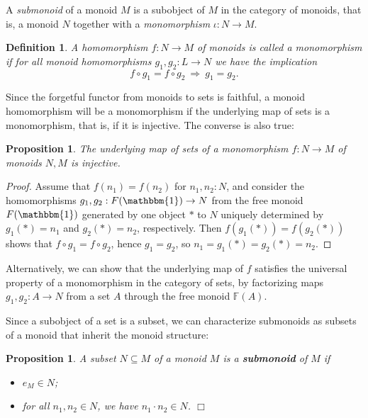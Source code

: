 \documentclass{amsart}
\theoremstyle{plain}
\numberwithin{equation}{section} %
\numberwithin{figure}{section} %
\theoremstyle{plain}
\theoremstyle{plain}
\theoremstyle{plain}
\theoremstyle{plain}
\theoremstyle{plain}
\newtheorem{prop}[thm]{Proposition} %
\theoremstyle{plain}
\newtheorem{Def}[thm]{Definition} %
\theoremstyle{remark}
\theoremstyle{remark}
\theoremstyle{remark}
\begin{document}
A \textit{submonoid} of a monoid $M$ is a subobject of $M$ in the category of monoids, that is, a monoid $N$ together with a \textit{monomorphism} $\iota: N \rightarrow M$. 

\begin{Def} \label{monomorphism-def}  %
A homomorphism $f : N \rightarrow M$ of monoids is called a monomorphism if for all monoid homomorphisms $g_1, g_2 : L \rightarrow N$ we have the implication 
\[ f \circ g_1 = f \circ g_2\ \Rightarrow\ g_1 = g_2. \] 
\end{Def}

Since the forgetful functor from monoids to sets is faithful, a monoid homomorphism will be a monomorphism if the underlying map of sets is a monomorphism, that is, if it is injective. 
The converse is also true:
\begin{prop}   \label{mono-mon-inj-prop}
The underlying map of sets of a monomorphism $f : N \rightarrow M$ of monoids $N, M$ is injective.
\end{prop}
\begin{proof}
Assume that $f(n_1) = f(n_2)$ for $n_1, n_2 : N$, and consider the homomorphisms $g_1, g_2 : F(\mathbbm{1}) \rightarrow N$ from the free monoid $F(\mathbbm{1})$ generated by one object $\ast$ to $N$ uniquely determined by $g_1(\ast) = n_1$ and $g_2(\ast) = n_2$, respectively. Then $f(g_1(\ast)) = f(g_2(\ast))$ shows that $f \circ g_1 = f \circ g_2$, hence $g_1 = g_2$, so $n_1 = g_1(\ast) = g_2(\ast) = n_2$.
\end{proof}

Alternatively, we can show that the underlying map of $f$ satisfies the universal property of a monomorphism in the category of sets, by factorizing maps $g_1, g_2 : A \rightarrow N$ from a set $A$ through the free monoid $\mathbb{F}(A)$.

Since a subobject of a set is a subset, we can characterize submonoids as subsets of a monoid that inherit the monoid structure:
\begin{prop}   \label{submon-subset-prop}  
A subset $N \subseteq M$ of a monoid $M$ is a \textbf{submonoid} of $M$ if
\begin{itemize}
\item[(i)] $e_M \in N$;
\item[(ii)] for all $n_1, n_2 \in N$, we have $n_1 \cdot n_2 \in N$. \hfill $\Box$
\end{itemize}
\end{prop}
\end{document}

